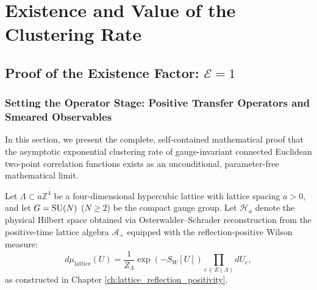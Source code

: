 \chapter{Existence and Value of the Clustering Rate}
\label{ch:existence_value}
\label{ch:existence_value_proofs}

\section{Proof of the Existence Factor: \texorpdfstring{$\mathcal{E} = 1$}{E = 1}}
\label{sec:proof_existence_factor}

\subsection{Setting the Operator Stage: Positive Transfer Operators and Smeared Observables}
\label{subsec:operator_stage}

In this section, we present the complete, self-contained mathematical proof that the asymptotic exponential clustering rate of gauge-invariant connected Euclidean two-point correlation functions exists as an unconditional, parameter-free mathematical limit.

Let $\Lambda \subset a \mathbb{Z}^4$ be a four-dimensional hypercubic lattice with lattice spacing $a > 0$, and let $G = \mathrm{SU}(N)$ ($N \ge 2$) be the compact gauge group. Let $\mathcal{H}_a$ denote the physical Hilbert space obtained via Osterwalder--Schrader reconstruction from the positive-time lattice algebra $\mathcal{A}_+$ equipped with the reflection-positive Wilson measure:
\begin{equation}
\label{eq:ch9_wilson_measure}
d\mu_{\mathrm{lattice}}(U) = \frac{1}{Z_\Lambda} \exp\left( -S_W[U] \right) \prod_{e \in E(\Lambda)} dU_e,
\end{equation}
as constructed in Chapter \ref{ch:lattice_reflection_positivity}.

